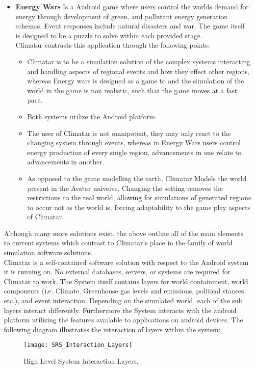 \documentclass[]{article}
\begin{document}
\begin{itemize}
	\item \textbf{Energy Wars} 
		Is a Android game\cite{EW} where users control the worlds demand for energy through development of green, and pollutant energy generation schemas. Event responses include natural disasters and war. The game itself is designed to be a puzzle to solve within each provided stage.\\
		Climatar contrasts this application through the following points:
		\begin{itemize}
			\item Climatar is to be a simulation solution of the complex systems interacting and handling aspects of regional events and how they effect other regions, whereas Energy wars is designed as a game to and the simulation of the world in the game is non realistic, such that the game moves at a fast pace.
			\item Both systems utilize the Android platform.
			\item The user of Climatar is not omnipotent, they may only react to the changing system through events, whereas in Energy Wars users control energy production of every single region, advancements in one relate to advancements in another.
			\item As opposed to the game modelling the earth, Climatar Models the world present in the Avatar universe. Changing the setting removes the restrictions to the real world, allowing for  simulations of generated regions to occur not as the world is, forcing adaptability to the game play aspects of Climatar.
		\end{itemize}
\end{itemize}

Although many more solutions exist, the above outline all of the main elements to current systems which contrast to Climatar's place in the family of world simulation software solutions.\\

Climatar is a self-contained software solution with respect to the Android system it is running on. No external databases, servers, or systems are required for Climatar to work. The System itself contains layers for world containment, world components (i.e. Climate, Greenhouse gas levels and emissions, political stances etc.), and event interaction. Depending on the simulated world, each of the sub layers interact differently. Furthermore the System interacts with the android platform utilizing the features available to applications on android devices. The following diagram illustrates the interaction of layers within the system:
\begin{figure}[h]
  \centering
  \texttt{[image: SRS\_Interaction\_Layers]}
  \caption{High Level System Interaction Layers.}
\end{figure}
\newpage
\end{document}
